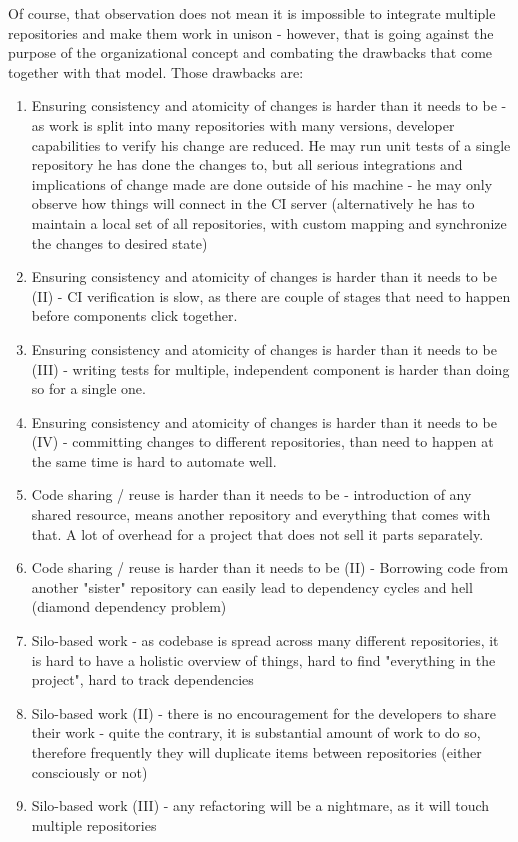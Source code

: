 \documentclass{article}
\begin{document}
Of course, that observation does not mean it is impossible to integrate multiple repositories and make them work in unison - however, that is going against the purpose of the organizational concept and combating the 
drawbacks that come together with that model. Those drawbacks are:

\begin{enumerate}
	\item Ensuring consistency and atomicity of changes is harder than it needs to be - as work is split into many repositories with many versions, developer capabilities to verify his change are reduced. 
	He may run unit tests of a single repository he has done the changes to, but all serious integrations and implications of change made are done outside of his machine - he may only observe how things will 
	connect in the CI server (alternatively he has to maintain a local set of all repositories, with custom mapping and synchronize the changes to desired state)
	\item Ensuring consistency and atomicity of changes is harder than it needs to be (II) - CI verification is slow, as there are couple of stages that need to happen before components click together.
	\item Ensuring consistency and atomicity of changes is harder than it needs to be (III) - writing tests for multiple, independent component is harder than doing so for a single one.
	\item Ensuring consistency and atomicity of changes is harder than it needs to be (IV) - committing changes to different repositories, than need to happen at the same time is hard to automate well.
	\item Code sharing / reuse is harder than it needs to be - introduction of any shared resource, means another repository and everything that comes with that. A lot of overhead for a project that does not sell it parts separately.
	\item Code sharing / reuse is harder than it needs to be (II) - Borrowing code from another "sister" repository can easily lead to dependency cycles and hell (diamond dependency problem)
	\item Silo-based work - as codebase is spread across many different repositories, it is hard to have a holistic overview of things, hard to find "everything in the project", hard to track dependencies
	\item Silo-based work (II) - there is no encouragement for the developers to share their work - quite the contrary, it is substantial amount of work to do so, therefore frequently they will duplicate items between repositories 
	(either consciously or not)
	\item Silo-based work (III) - any refactoring will be a nightmare, as it will touch multiple repositories
\end{enumerate}
\end{document}
